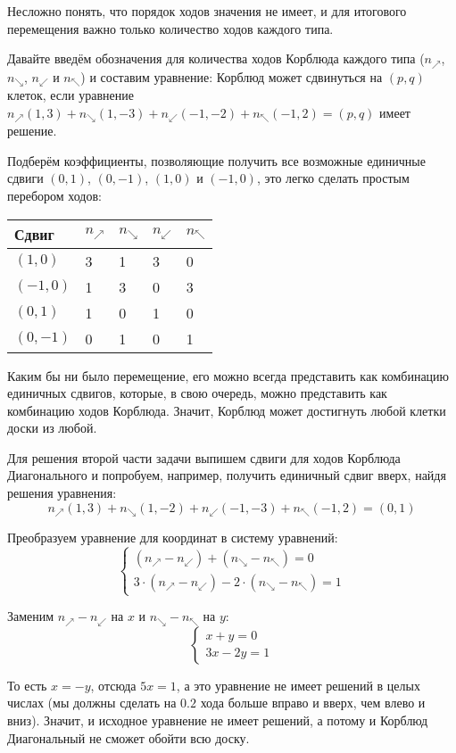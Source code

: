 \begin{itemize}
Несложно понять, что порядок ходов значения не имеет, и для итогового перемещения 
важно только количество ходов каждого типа.

Давайте введём обозначения для количества ходов Корблюда каждого типа 
($n_\nearrow$, $n_\searrow$, $n_\swarrow$ и $n_\nwarrow$) и
составим уравнение: Корблюд может
сдвинуться на $(p,q)$ клеток, если уравнение
$n_\nearrow(1,3) + n_\searrow(1,-3) + n_\swarrow(-1,-2) + n_\nwarrow(-1,2) = (p,q)$
имеет решение.

Подберём коэффициенты, позволяющие получить все возможные единичные сдвиги $(0,1)$,
$(0,-1)$, $(1,0)$ и $(-1,0)$, это легко сделать простым перебором ходов:

\begin{center}\begin{tabular}{lllll}
Сдвиг & $n_\nearrow$ & $n_\searrow$ & $n_\swarrow$ & $n_\nwarrow$ \\
\hline
$(1,0)$  & 3 & 1 & 3 & 0\\
$(-1,0)$ & 1 & 3 & 0 & 3\\
$(0,1)$  & 1 & 0 & 1 & 0\\
$(0,-1)$ & 0 & 1 & 0 & 1
\end{tabular}\end{center}

Каким бы ни было перемещение, его можно всегда представить как комбинацию единичных сдвигов,
которые, в свою очередь, можно представить как комбинацию ходов Корблюда. Значит, Корблюд может 
достигнуть любой клетки доски из любой.

Для решения второй части задачи выпишем сдвиги для ходов Корблюда Диагонального и попробуем,
например, получить единичный сдвиг вверх, найдя решения уравнения:
$$n_\nearrow(1,3) + n_\searrow(1,-2) + n_\swarrow(-1,-3) + n_\nwarrow(-1,2) = (0,1)$$

Преобразуем уравнение для координат в систему уравнений:
$$\left\{\begin{array}{l}
  (n_\nearrow - n_\swarrow) + (n_\searrow - n_\nwarrow) = 0\\
  3\cdot(n_\nearrow- n_\swarrow) - 2\cdot(n_\searrow-n_\nwarrow)=1
\end{array}\right.$$

Заменим $n_\nearrow- n_\swarrow$ на $x$ и $n_\searrow-n_\nwarrow$ на $y$:
$$\left\{\begin{array}{l}
  x + y = 0\\
  3x - 2y=1
\end{array}\right.$$

То есть $x = -y$, отсюда $5x = 1$, а это уравнение не имеет решений в целых числах
(мы должны сделать на $0.2$ хода больше вправо и вверх, чем влево и вниз).
Значит, и исходное уравнение не имеет решений, а потому и Корблюд Диагональный
не сможет обойти всю доску.


\end{itemize}
